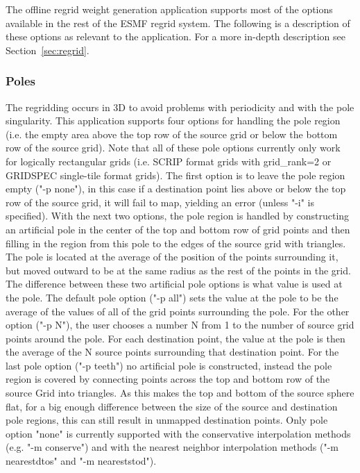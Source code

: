  The offline regrid weight generation application supports most of the options available in the rest of the ESMF regrid system. The following is a description of these options as relevant to the application. For a more in-depth description see Section~\ref{sec:regrid}.

\subsubsection{Poles}\label{sec:rwg_poles}
The regridding occurs in 3D to avoid
problems with periodicity and with the pole singularity. This application
supports four options for handling the pole region (i.e. the empty area above the top row of the source grid or below
the bottom row of the source grid).  Note that all of these pole options currently only work for logically rectangular grids (i.e. SCRIP format grids with grid\_rank=2 or GRIDSPEC single-tile format grids). The first option is to leave  the pole region empty ("-p none"), in this
case if a destination point lies above or below the
top row of the source grid, it will fail to map, yielding an error (unless "-i" is specified).
With the next two options, the pole region is handled by constructing
an artificial pole in the center of the top and bottom row of grid points and then filling
in the region from this pole to the edges of the source grid with triangles.
The pole is located at the average of the position of the points surrounding
it, but moved outward to be at the same radius as the rest of the points
in the grid. The difference between these two artificial pole options is what value is used at the pole.
 The default pole option ("-p all") sets the value at the pole to be the average of the values
of all of the grid points surrounding the pole. For the other option ("-p N"), the user chooses
a number N from 1 to the number of source grid points around the pole. For
each destination point, the value at the pole is then the average of the N source points
surrounding that destination point. For the last pole option ("-p teeth") no artificial pole is constructed, instead the
pole region is covered by connecting points across the top and bottom row of the source Grid into triangles. As
this makes the top and bottom of the source sphere flat, for a big enough difference between the size of
the source and destination pole regions, this can still result in unmapped destination points.
Only pole option "none" is currently supported with the conservative interpolation methods (e.g. "-m conserve") and with the
nearest neighbor interpolation methods ("-m nearestdtos" and "-m neareststod").

